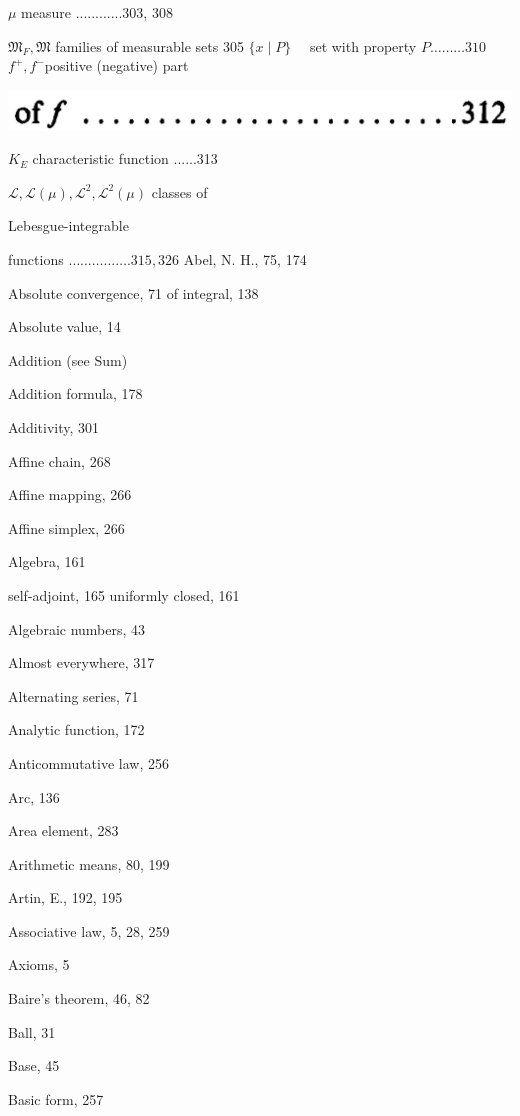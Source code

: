 \documentclass[10pt]{article}
\begin{document}
$\mu$ measure ............303, 308

$\mathfrak{M}_{F}, \mathfrak{M}$ families of measurable sets 305 $\{x \mid P\} \quad$ set with property $P \ldots \ldots \ldots 310$ $f^{+}, f^{-}$positive (negative) part

\begin{center}
\includegraphics[max width=\textwidth]{2023_08_17_055ccbec3ce53a1b74ebg-348}
\end{center}

$K_{E}$ characteristic function ......313

$\mathscr{L}, \mathscr{L}(\mu), \mathscr{L}^{2}, \mathscr{L}^{2}(\mu)$ classes of

Lebesgue-integrable

functions $\ldots \ldots \ldots \ldots \ldots .315,326$ Abel, N. H., 75, 174

Absolute convergence, 71 of integral, 138

Absolute value, 14

Addition (see Sum)

Addition formula, 178

Additivity, 301

Affine chain, 268

Affine mapping, 266

Affine simplex, 266

Algebra, 161

self-adjoint, 165 uniformly closed, 161

Algebraic numbers, 43

Almost everywhere, 317

Alternating series, 71

Analytic function, 172

Anticommutative law, 256

Arc, 136

Area element, 283

Arithmetic means, 80, 199

Artin, E., 192, 195

Associative law, 5, 28, 259

Axioms, 5

Baire's theorem, 46, 82

Ball, 31

Base, 45

Basic form, 257
\end{document}
